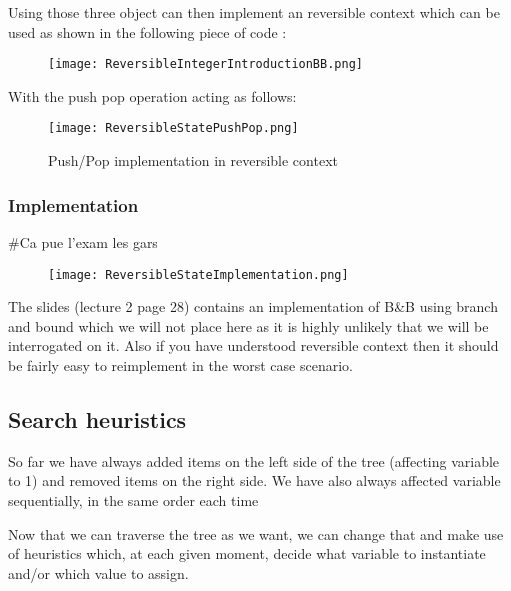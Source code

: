 Using those three object can then implement an reversible context 
which can be used as shown in the following piece of code :

\begin{figure}[!ht]
    \centering
    \texttt{[image: ReversibleIntegerIntroductionBB.png]}
    \label{fig:Knapsack_example}
\end{figure}
\FloatBarrier

With the push pop operation acting as follows:

\begin{figure}[!ht]
    \centering
    \texttt{[image: ReversibleStatePushPop.png]}
    \caption{Push/Pop implementation in reversible context}
    \label{fig:Knapsack_example}
\end{figure}
\FloatBarrier

\subsubsection{Implementation}

\#Ca pue l'exam les gars

\begin{figure}[!ht]
    \centering
    \texttt{[image: ReversibleStateImplementation.png]}
    \label{fig:Knapsack_example}
\end{figure}
\FloatBarrier

The slides (lecture 2 page 28) contains an implementation of B\&B using branch and bound
which we will not place here as it is highly unlikely that we will be interrogated on it.
Also if you have understood reversible context then it should be fairly easy 
to reimplement in the worst case scenario.

\subsection{Search heuristics}

So far we have always added items on the left side of the tree (affecting variable to 1)
and removed items on the right side. We have also always affected variable sequentially, 
in the same order each time\newline

Now that we can traverse the tree as we want, we can change that and make use of 
heuristics which, at each given moment, decide what variable to instantiate 
and/or which value to assign. 
\newline

